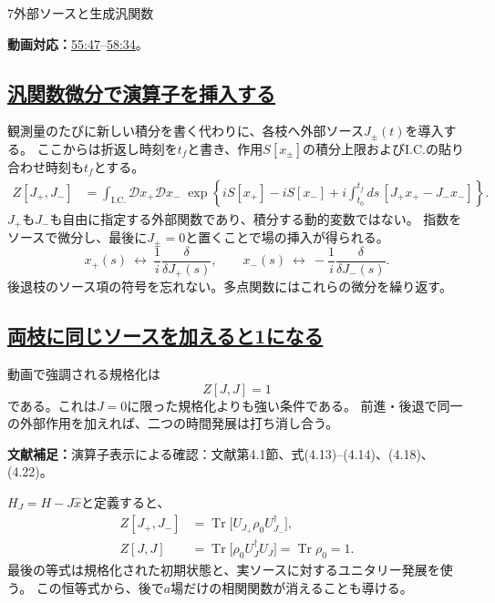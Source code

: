 \documentclass[a4paper,11pt]{ltjsarticle}
\newcommand{\subsectionlink}[1]{\subsection[#1]{\hyperlink{toc}{#1}}}
\numberwithin{equation}{section}
\newcommand{\Tr}{\operatorname{Tr}}
\newcommand{\video}[2]{\href{https://www.youtube.com/watch?v=RYxzcUhIHjk\&t=#1s}{#2}}
\newcommand{\videosource}[1]{\par\noindent\textcolor{noteblue}{\textbf{動画対応：}#1}\par\smallskip}
\newcommand{\supplement}[1]{\par\medskip\noindent\textcolor{notered}{\textbf{文献補足：}}#1\par\smallskip}
\begin{document}
\begin{lecturesection}{7}{外部ソースと生成汎関数}
\label{sec:sources}
\videosource{\video{3347}{55:47}--\video{3514}{58:34}。}
\subsectionlink{汎関数微分で演算子を挿入する}
観測量のたびに新しい積分を書く代わりに、各枝へ外部ソース$J_\pm(t)$を導入する。
ここからは折返し時刻を$t_f$と書き、作用$S[x_\pm]$の積分上限およびI.C.の貼り合わせ時刻も$t_f$とする。
\begin{align}
 Z[J_+,J_-]
 &=\int_{\mathrm{I.C.}}\mathcal D x_+\mathcal D x_-\;
 \exp\left\{iS[x_+]-iS[x_-]
     +i\int_{t_0}^{t_f}ds\,[J_+x_+-J_-x_-]\right\}.
 \label{eq:Z}
\end{align}
$J_+$も$J_-$も自由に指定する外部関数であり、積分する動的変数ではない。
指数をソースで微分し、最後に$J_\pm=0$と置くことで場の挿入が得られる。
\begin{equation}
 x_+(s)\ \longleftrightarrow\ \frac1i\frac\delta{\delta J_+(s)},
 \qquad
 x_-(s)\ \longleftrightarrow\ -\frac1i\frac\delta{\delta J_-(s)}.
\end{equation}
後退枝のソース項の符号を忘れない。多点関数にはこれらの微分を繰り返す。

\subsectionlink{両枝に同じソースを加えると1になる}
動画で強調される規格化は
\begin{equation}Z[J,J]=1\label{eq:ZZ}
\end{equation}
である。これは$J=0$に限った規格化よりも強い条件である。
前進・後退で同一の外部作用を加えれば、二つの時間発展は打ち消し合う。

\supplement{演算子表示による確認：文献\cite{Pajer:2026fuo}第4.1節、式(4.13)--(4.14)、(4.18)、(4.22)。}
$H_J=H-J\hat x$と定義すると、
\begin{align}
 Z[J_+,J_-]&=\Tr\bigl[U_{J_+}\rho_0U_{J_-}^\dagger\bigr],\\
 Z[J,J]&=\Tr\bigl[\rho_0 U_J^\dagger U_J\bigr]=\Tr\rho_0=1.
\end{align}
最後の等式は規格化された初期状態と、実ソースに対するユニタリー発展を使う。
この恒等式から、後で$a$場だけの相関関数が消えることも導ける。
\end{lecturesection}
\end{document}
